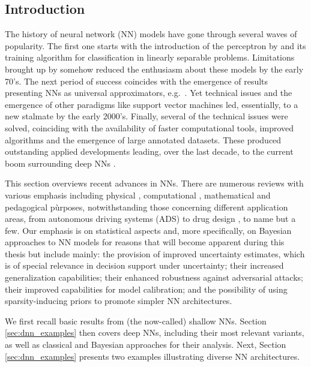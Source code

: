
\subsection{Introduction}

The history of neural network (NN) models have gone 
through several waves of popularity. The first 
one starts with the introduction of the perceptron
by \textcite{rosenblatt1958perceptron} and its training algorithm 
for classification in linearly separable problems.
Limitations brought up by 
\textcite{minsky} somehow reduced the enthusiasm
about these models by the early 70's.
The next period of success coincides with the emergence
of results presenting NNs as universal
approximators, e.g.\ \parencite{cybenko1989approximation}. Yet 
technical issues and the emergence of other paradigms like 
support vector machines led, essentially,
to a new stalmate by the early 2000's. Finally, several of the 
technical issues were solved, coinciding with the 
availability of faster computational tools,
improved algorithms and the emergence of
large annotated datasets. These produced outstanding 
applied developments leading, over the last decade, to the current boom 
surrounding deep NNs \parencite{10.5555/3086952}. 

This section overviews  
recent advances in NNs. 
There are numerous reviews with various emphasis 
including physical \parencite{cirac}, computational \parencite{chollet}, mathematical \parencite{maths} and pedagogical \parencite{teach} pùrposes, 
notwithstanding  those concerning different  application areas, 
from autonomous driving systems (ADS) \parencite{rumanos} to
drug design \parencite{hessler}, to name but a few. 
Our emphasis is on statistical
aspects and, more specifically, on Bayesian approaches
to NN models for reasons that will become 
apparent during this thesis but include mainly:
the provision of improved uncertainty estimates, which is
of special relevance in decision support under uncertainty; their 
increased generalization capabilities; their 
enhanced robustness against adversarial attacks; 
their improved capabilities for model calibration;
and the possibility of using sparsity-inducing priors
to promote simpler NN architectures.

We first recall basic results from (the now-called) 
shallow NNs.
Section \ref{sec:dnn_examples} then covers deep NNs, including their most
relevant 
variants, as well as classical and Bayesian approaches
for their analysis. Next, Section \ref{sec:dnn_examples}
presents two examples illustrating
diverse NN architectures.

